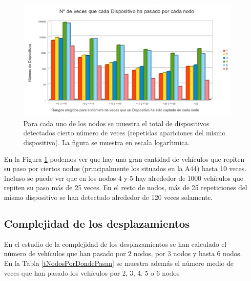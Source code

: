\documentclass[twocolumn,twoside]{Jornadas}
\begin{document}
 \begin{figure}[htb]
 \begin{center}
 \includegraphics[scale=0.20]{Intervalos.jpg}
 \caption{Para cada uno de los nodos se muestra el total de dispositivos detectados cierto número de veces (repetidas apariciones del mismo dispositivo). La figura se muestra en escala logarítmica.
 \label{Intervalos}}
 \end{center}
 \end{figure}
 

En la Figura \ref{Intervalos} podemos ver que hay una gran cantidad de vehículos que repiten su paso por ciertos nodos (principalmente los situados en la A44) hasta 10 veces. 
Incluso se puede ver que en los nodos 4 y 5 hay alrededor de 1000 vehículos que repiten su paso más de 25 veces. En el resto de nodos, más de 25 repeticiones del mismo dispositivo 
se han detectado alrededor de 120 veces solamente.


\subsection{Complejidad de los desplazamientos}

En el estudio de la complejidad de los desplazamientos se han calculado el número de vehículos que han pasado por 2 nodos, por 3 nodos y hasta 6 nodos. 
En la Tabla \ref{tNodosPorDondePasan} se muestra además el número medio de veces que han pasado los vehículos por 2, 3, 4, 5 o 6 nodos
\end{document}
